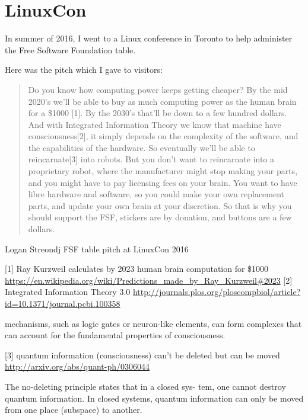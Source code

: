 \section{LinuxCon}
In summer of 2016, I went to a Linux conference in Toronto to help administer
the Free Software Foundation table. 

Here was the pitch which I gave to visitors:

\blockquote{Do you know how computing power keeps getting cheaper?
By the mid 2020’s  we’ll be able to buy as much computing power as the human 
brain for a \$1000 [1].
By the 2030’s that’ll be down to a few hundred dollars.
And with Integrated Information Theory  we know that machine have 
consciousness[2], it simply depends on the complexity of the software, and the capabilities of the hardware.
So eventually we’ll be able to reincarnate[3] into robots.
But you don’t want to reincarnate into a proprietary robot, where the manufacturer might stop making your parts, and you might have to pay licensing fees on your brain.
You want to have libre hardware and software, so you could make your own replacement parts, and update your own brain at your discretion.
So that is why you should support the FSF, stickers are by donation, and buttons
are a few dollars.}{Logan Streondj FSF table pitch at LinuxCon 2016}

[1] Ray Kurzweil calculates by 2023 human brain computation for \$1000
\url{https://en.wikipedia.org/wiki/Predictions_made_by_Ray_Kurzweil#2023}
[2] Integrated Information Theory 3.0
\url{http://journals.plos.org/ploscompbiol/article?id=10.1371/journal.pcbi.100358}

    mechanisms, such as logic gates or neuron-like elements, can form complexes that can account for the fundamental properties of consciousness.

[3] quantum information (consciousness) can’t be deleted but can be moved
\url{http://arxiv.org/abs/quant-ph/0306044}

    The no-deleting principle states that in a closed sys-
    tem, one cannot destroy quantum information. In closed
    systems, quantum information can only be moved from
    one place (subspace) to another.

